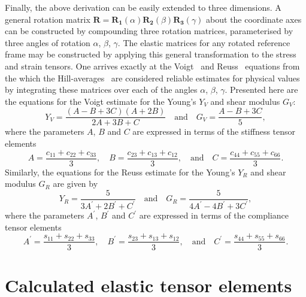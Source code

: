 Finally, 
the above derivation can be 
easily extended to three dimensions.
%
A general rotation matrix 
$\boldsymbol{R}=\boldsymbol{R_1}(\alpha)\boldsymbol{R_2}(\beta)\boldsymbol{R_3}(\gamma)$ 
about the coordinate axes 
can be constructed 
by compounding three rotation matrices, 
parameterised by three angles 
of rotation 
$\alpha$, $\beta$, $\gamma$.
%
The elastic matrices for any rotated reference 
frame may be constructed 
by applying this general transformation  
to the stress and strain tensors.
%
One arrives exactly at the Voigt~\cite{ZAMM:ZAMM19290090104,cook1999advanced} 
and Reuss~\cite{ANDP:ANDP18892741206} 
equations from the which 
the Hill-averages~\cite{0370-1298-65-5-307} 
are considered reliable estimates 
for physical values 
by integrating these matrices over 
each of the angles 
$\alpha$, $\beta$, $\gamma$.
%
Presented here are the equations for the 
Voigt estimate for the Young's $Y_V$ 
and shear modulus $G_V$:
%
\begin{equation}
Y_V=\frac{(A-B+3C)(A+2B)}{2A+3B+C} 
\quad \mbox{and} \quad
G_V=\frac{A-B+3C}{5}, 
\label{eq:voigt1}
\end{equation}
%
where the parameters $A$, $B$ and $C$ 
are expressed in terms of the stiffness tensor elements
%
\begin{equation}
A=\frac{c_{11}+c_{22}+c_{33}}{3},
\quad
B=\frac{c_{23}+c_{13}+c_{12}}{3},
\quad\mbox{and}\quad
C=\frac{c_{44}+c_{55}+c_{66}}{3}.
\label{eq:voigt2}
\end{equation}
%
Similarly, the equations for the 
Reuss estimate for the Young's $Y_R$ 
and shear modulus $G_R$ are given by
%
\begin{equation}
Y_R=\frac{5}{3A^\prime+2B^\prime+C^\prime}
\quad \mbox{and} \quad
G_R = \frac{5}{4A^\prime-4B^\prime+3C^\prime},
\label{eq:reuss1}
\end{equation}
%
where the parameters $A^\prime$, $B^\prime$ and $C^\prime$ 
are expressed in terms of the compliance tensor elements
%
\begin{equation}
A^\prime=\frac{s_{11}+s_{22}+s_{33}}{3},
\quad
B^\prime=\frac{s_{23}+s_{13}+s_{12}}{3},
\quad \mbox{and} \quad
C^\prime=\frac{s_{44}+s_{55}+s_{66}}{3}.
\label{eq:reuss2}
\end{equation}

\clearpage
\section{Calculated elastic tensor elements}
\label{sec:calculated_elastic_tensor_elements}

